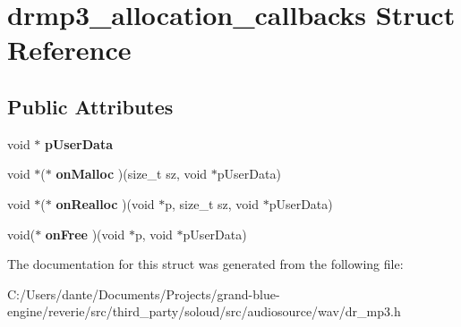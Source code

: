\hypertarget{structdrmp3__allocation__callbacks}{}\section{drmp3\+\_\+allocation\+\_\+callbacks Struct Reference}
\label{structdrmp3__allocation__callbacks}
\subsection*{Public Attributes}
\begin{DoxyCompactItemize}
\item 
\mbox{\label{structdrmp3__allocation__callbacks_a6143e313c75cae01f6aa30544d476dc2}} 
void $\ast$ {\bfseries p\+User\+Data}
\item 
\mbox{\label{structdrmp3__allocation__callbacks_a5619d5a41e0851029c01dfbf7b2dbbd1}} 
void $\ast$($\ast$ {\bfseries on\+Malloc} )(size\+\_\+t sz, void $\ast$p\+User\+Data)
\item 
\mbox{\label{structdrmp3__allocation__callbacks_a1ec035daacb1cb33f1e55991a596be5f}} 
void $\ast$($\ast$ {\bfseries on\+Realloc} )(void $\ast$p, size\+\_\+t sz, void $\ast$p\+User\+Data)
\item 
\mbox{\label{structdrmp3__allocation__callbacks_a48ab0ae1fade6de6bff8c6609a14f427}} 
void($\ast$ {\bfseries on\+Free} )(void $\ast$p, void $\ast$p\+User\+Data)
\end{DoxyCompactItemize}


The documentation for this struct was generated from the following file\+:\begin{DoxyCompactItemize}
\item 
C\+:/\+Users/dante/\+Documents/\+Projects/grand-\/blue-\/engine/reverie/src/third\+\_\+party/soloud/src/audiosource/wav/dr\+\_\+mp3.\+h\end{DoxyCompactItemize}
